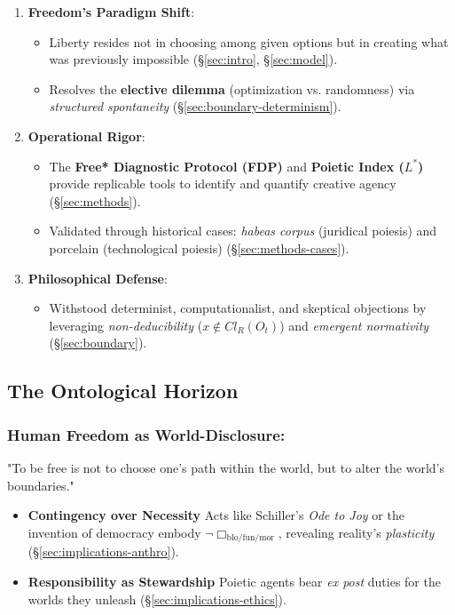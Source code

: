 \documentclass[11pt,a4paper]{article}
\begin{document}
\begin{enumerate}
  \item \textbf{Freedom's Paradigm Shift}:
  \begin{itemize}
    \item Liberty resides not in choosing among given options but in creating what was previously impossible (\S\ref{sec:intro}, \S\ref{sec:model}).
    \item Resolves the \textbf{elective dilemma} (optimization vs. randomness) via \emph{structured spontaneity} (\S\ref{sec:boundary-determinism}).
  \end{itemize}
  \item \textbf{Operational Rigor}:
  \begin{itemize}
    \item The \textbf{Free* Diagnostic Protocol (FDP)} and \textbf{Poietic Index (\(L^{*}\))} provide replicable tools to identify and quantify creative agency (\S\ref{sec:methods}).
    \item Validated through historical cases: \emph{habeas corpus} (juridical poiesis) and porcelain (technological poiesis) (\S\ref{sec:methods-cases}).
  \end{itemize}
  \item \textbf{Philosophical Defense}:
  \begin{itemize}
    \item Withstood determinist, computationalist, and skeptical objections by leveraging \emph{non-deducibility} (\(x\notin Cl_{R}(O_{t})\)) and \emph{emergent normativity} (\S\ref{sec:boundary}).
  \end{itemize}
\end{enumerate}

\subsection{The Ontological Horizon}

\subsubsection{Human Freedom as World-Disclosure:}

"To be free is not to choose one's path within the world, but to alter the world's boundaries." \cite[ p. 864]{torres2022}

\begin{itemize}
  \item \textbf{Contingency over Necessity} Acts like Schiller's \emph{Ode to Joy} or the invention of democracy embody \(\neg\Box_{\text{blo/fun/mor}}\), revealing reality's \emph{plasticity} (\S\ref{sec:implications-anthro}).
  \item \textbf{Responsibility as Stewardship} Poietic agents bear \emph{ex post} duties for the worlds they unleash (\S\ref{sec:implications-ethics}).
\end{itemize}
\end{document}
